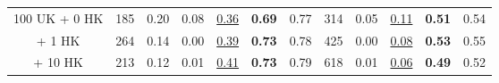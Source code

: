 \begin{table*}[!ht]
{\begin{tabular}{c|rccccc|rcccc}
100 UK + \hspace{0.5ex} 0 HK  & 185                                              & 0.20                                                                       & 0.08                                                                        & \underline{0.36}                                                                & \textbf{0.69}                                                              & 0.77                                                                           & 314                                              & 0.05                                                                        & \underline{0.11}                                                                & \textbf{0.51}                                                              & 0.54                                                                          \\
\hspace{7ex} + \hspace{0.5ex} 1 HK  & 264                                              & 0.14                                                                       & 0.00                                                                        & \underline{0.39}                                                                & \textbf{0.73}                                                              & 0.78                                                                           & 425                                              & 0.00                                                                        & \underline{0.08}                                                                & \textbf{0.53}                                                              & 0.55                                                                          \\
\hspace{7ex} + 10 HK & 213                                              & 0.12                                                                       & 0.01                                   & \underline{0.41}                                                                & \textbf{0.73}                                                              & 0.79                                                                           & 618                                              & 0.01                                                                        & \underline{0.06}                                                                & \textbf{0.49}                                                              & 0.52                                                                          \\

\end{tabular}}
\end{table*}
